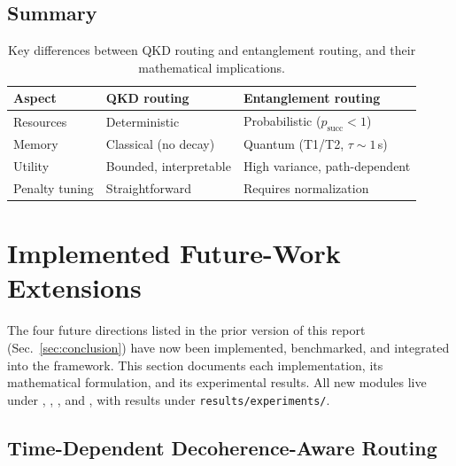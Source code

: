 \documentclass[10pt,a4paper]{article}
\begin{document}
\subsection{Summary}

\begin{table}[H]
  \centering
  \caption{Key differences between QKD routing and entanglement
    routing, and their mathematical implications.}
  \label{tab:comparison}
  \begin{tabular}{lp{4cm}p{5cm}}
    \toprule
    Aspect & QKD routing & Entanglement routing \\
    \midrule
    Resources & Deterministic & Probabilistic ($p_{\text{succ}} < 1$) \\
    Memory & Classical (no decay) & Quantum (T1/T2, $\tau \sim 1$\,s) \\
    Utility & Bounded, interpretable & High variance, path-dependent \\
    Penalty tuning & Straightforward & Requires normalization \\
    \bottomrule
  \end{tabular}
\end{table}

\section{Implemented Future-Work Extensions}
\label{sec:futurework}

The four future directions listed in the prior version of this report
(Sec.~\ref{sec:conclusion}) have now been implemented, benchmarked, and
integrated into the framework.  This section documents each
implementation, its mathematical formulation, and its experimental
results.  All new modules live under
,
,
, and
, with results under
\texttt{results/experiments/}.

\subsection{Time-Dependent Decoherence-Aware Routing}
\label{sec:time-dep}
\end{document}
